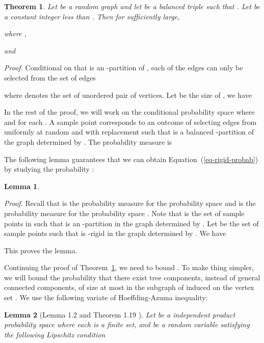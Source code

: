\documentclass[11pt]{article}
\newtheorem{theorem}{Theorem}
\newtheorem{lemma}{Lemma}[section]
\providecommand{\qed}{\hfill }
\newenvironment{proof}[0]{\textit{Proof.} }{\hfill  \qed}
\begin{document}
\begin{theorem}
\label{thm-rigid-conditional}
Let  be a random graph and let 
be a balanced triple such that . Let 
be a constant integer less than .  
Then for  sufficiently large,

where ,

and 


\end{theorem}
\begin{proof} 
Conditional on that  is an -partition of , each of the
 edges can only be selected from the set of edges

where  denotes the set of unordered pair of vertices. Let  be the size of 
, we have


In the rest of the proof, we will work on the conditional probability space
 where
 and 
 for each . A sample point 
 corresponds to an outcome 
of selecting  edges from  uniformly at random and with replacement such that
 is a balanced -partition of the graph determined by . 
The probability measure  is
    
The following lemma guarantees that we can obtain Equation~(\ref{eq-rigid-probab})
by studying the probability :  

\begin{lemma}
\label{lem-equiv-condi}

\end{lemma}
\begin{proof}
Recall that  is the probability measure for the probability 
space  and 
 is the probability measure 
for the probability space .
Note that  is the set of sample points  in  such that 
 is an -partition in the graph determined by .
Let  be the set of sample points  such that  
 is -rigid in the graph determined by .
We have 

This proves the lemma. 
\end{proof}

Continuing the proof of Theorem~\ref{thm-rigid-conditional}, we need to bound 
. 
To make thing simpler, we will 
bound the probability that there exist tree components, instead of general connected components, of size at most  in the subgraph of  induced on the vertex set .
We use the following variate of Hoeffding-Azuma inequality: 
\begin{lemma}[Lemma 1.2 \cite{mcdiarmid89} and Theorem 1.19 \cite{bollobas01}]
\label{lem-bounded-diff}
Let  be a independent 
product probability space where each  is a finite set, and 
be a random variable satisfying the following Lipschitz condition


\end{lemma}
\end{proof}
\end{document}
